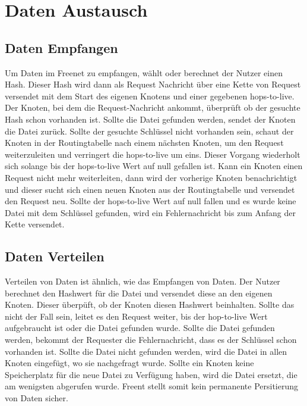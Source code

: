 \section{Daten Austausch}
\subsection{Daten Empfangen}
Um Daten im Freenet zu empfangen, wählt oder berechnet der Nutzer einen Hash.
Dieser Hash wird dann als Request Nachricht über eine Kette von Request
versendet mit dem Start des eigenen Knotens und einer gegebenen hops-to-live.
Der Knoten, bei dem die Request-Nachricht ankommt, überprüft ob der gesuchte
Hash schon vorhanden ist. Sollte die Datei gefunden werden, sendet der Knoten
die Datei zurück. Sollte der gesuchte Schlüssel nicht vorhanden sein, schaut
der Knoten in der Routingtabelle nach einem nächsten Knoten, um den Request
weiterzuleiten und verringert die hops-to-live um eins.
Dieser Vorgang wiederholt sich solange bis der hops-to-live Wert auf null
gefallen ist.
Kann ein Knoten einen Request nicht mehr weiterleiten, dann wird der vorherige
Knoten benachrichtigt und dieser sucht sich einen neuen Knoten aus der
Routingtabelle und versendet den Request neu.
Sollte der hops-to-live Wert auf null fallen und es wurde keine Datei mit dem
Schlüssel gefunden, wird ein Fehlernachricht bis zum Anfang der Kette
versendet.

\subsection{Daten Verteilen}
Verteilen von Daten ist ähnlich, wie das Empfangen von Daten. Der Nutzer
berechnet den Hashwert für die Datei und versendet diese an den eigenen Knoten.
Dieser überpüft, ob der Knoten diesen Hashwert beinhalten. Sollte das nicht
der Fall sein, leitet es den Request weiter, bis der hop-to-live Wert
aufgebraucht ist oder die Datei gefunden wurde. Sollte die Datei gefunden
werden, bekommt der Requester die Fehlernachricht, dass es der Schlüssel schon
vorhanden ist. Sollte die Datei nicht gefunden werden, wird die Datei in
allen Knoten eingefügt, wo sie nachgefragt wurde. Sollte ein Knoten keine
Speicherplatz für die neue Datei zu Verfügung haben, wird die Datei ersetzt,
die am wenigsten abgerufen wurde.
Freent stellt somit kein permanente Persitierung von Daten sicher.

